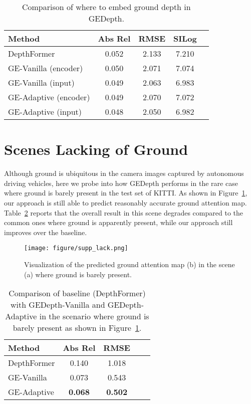 \documentclass[10pt,twocolumn,letterpaper]{article}
\begin{document}
\begin{table}[h]
\small
\begin{center}
\begin{tabular}{lcccc}
\hline
Method & Abs Rel  & RMSE  & SILog \\
\hline
DepthFormer & 0.052 & 2.133 & 7.210\\
\hline
GE-Vanilla (encoder) & 0.050 & 2.071 & 7.074\\
\hline
GE-Vanilla (input) & 0.049 & 2.063 & 6.983\\
\hline
GE-Adaptive (encoder) & 0.049 & 2.070 & 7.072\\
\hline
GE-Adaptive (input) & 0.048 & 2.050 & 6.982\\
\hline
\end{tabular}
\end{center}
\vspace{-1mm}
\caption{Comparison of where to embed ground depth in GEDepth.}
\label{tab:where}
\end{table}

\section{Scenes Lacking of Ground}
\label{lack}
Although ground is ubiquitous in the camera images captured by autonomous driving vehicles, here we probe into how GEDepth performs in the rare case where ground is barely present in the test set of KITTI. As shown in Figure~\ref{fig:lack}, our approach is still able to predict reasonably accurate ground attention map. Table~\ref{tab:lack} reports that the overall result in this scene degrades compared to the common ones where ground is apparently present, while our approach still improves over the
baseline.   

\begin{figure}
    \centering
    \texttt{[image: figure/supp\_lack.png]}
\caption{Visualization of the predicted ground attention map (b) in the scene (a) where ground is barely present.}  
    \label{fig:lack} 
\end{figure}

\begin{table}
\small
\begin{center}
\begin{tabular}{lcccc}
\hline
Method &    Abs Rel  & RMSE    \\
\hline
DepthFormer & 0.140 & 1.018 \\
\hline
GE-Vanilla  & 0.073 & 0.543  \\
\hline
GE-Adaptive & \textbf{0.068} & \textbf{0.502} \\
\hline
\end{tabular}
\end{center}
\vspace{-1mm}
\caption{Comparison of baseline (DepthFormer) with GEDepth-Vanilla and GEDepth-Adaptive in the scenario where ground is barely present as shown in Figure~\ref{fig:lack}.}
\label{tab:lack}
\end{table}
\end{document}
